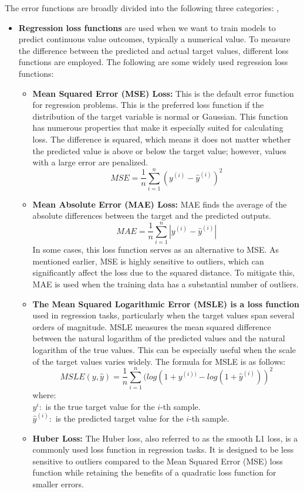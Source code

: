 The error functions are broadly divided into the following three categories: \cite{ansari2020building}, \cite{heaton2018ian}\\
\begin{itemize}
    \item \textbf{Regression loss functions} are used when we want to train models to predict continuous value outcomes, typically a numerical value. To measure the difference between the predicted and actual target values, different loss functions are employed. The following are some widely used regression loss functions:\\
    \begin{itemize}
    \item \textbf{Mean Squared Error (MSE) Loss:} This is the default error function for regression problems. This is the preferred loss function if the distribution of the target variable is normal or Gaussian. This function has numerous properties that make it especially suited for calculating loss. The difference is squared, which means it does not matter whether the predicted value is above or below the target value; however, values with a large error are penalized.\\
    $$MSE=\frac{1}{n}\sum_{i=1}^{n}(y^{(i)}-\hat{y}^{(i)})^{2}$$
    \item  \textbf{Mean Absolute Error (MAE) Loss:}  MAE finds the average of the absolute differences between the target and the predicted outputs.
    $$MAE=\frac{1}{n}\sum_{i=1}^{n}|y^{(i)}-\hat{y}^{(i)}|$$
    In some cases, this loss function serves as an alternative to MSE. As mentioned earlier, MSE is highly sensitive to outliers, which can significantly affect the loss due to the squared distance. To mitigate this, MAE is used when the training data has a substantial number of outliers.
    \item \textbf{The Mean Squared Logarithmic Error (MSLE) is a loss function}  used in regression tasks, particularly when the target values span several orders of magnitude. MSLE measures the mean squared difference between the natural logarithm of the predicted values and the natural logarithm of the true values. This can be especially useful when the scale of the target values varies widely.
    The formula for MSLE is as follows:
     $$MSLE(y,\hat{y})=\frac{1}{n}\sum_{i=1}^{n}(log(1+y^{(i))}-log(1+\hat{y}^{(i)}))^{2}$$
     where: \\
     $y^{i}: $ is the true target value for the \(i\)-th sample.\\
     $\hat{y}^{(i)}: $ is the predicted target value for the \(i\)-th sample.
     \item \textbf{Huber Loss: } The Huber loss, also referred to as the smooth L1 loss, is a commonly used loss function in regression tasks. It is designed to be less sensitive to outliers compared to the Mean Squared Error (MSE) loss function while retaining the benefits of a quadratic loss function for smaller errors.


\end{itemize}
\end{itemize}
